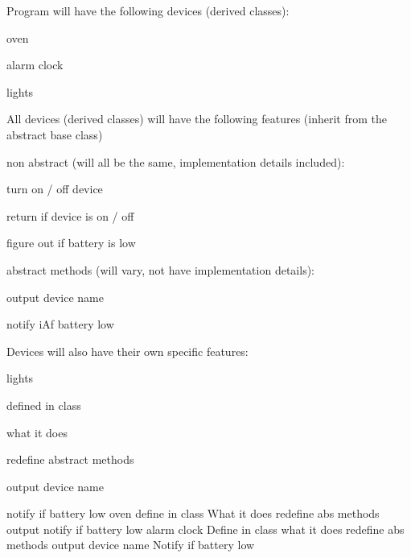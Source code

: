\begin{DoxyEnumerate}
\item Program will have the following devices (derived classes):\+
\begin{DoxyEnumerate}
\item oven
\item alarm clock
\item lights
\end{DoxyEnumerate}
\item All devices (derived classes) will have the following features (inherit from the abstract base class)
\begin{DoxyEnumerate}
\item non abstract (will all be the same, implementation details included):\+ ~\newline

\begin{DoxyEnumerate}
\item turn on /\+ off device
\item return if device is on /\+ off
\item figure out if battery is low
\end{DoxyEnumerate}
\end{DoxyEnumerate}
\begin{DoxyEnumerate}
\item abstract methods (will vary, not have implementation details):\+
\begin{DoxyEnumerate}
\item output device name
\item notify i\+Af battery low
\end{DoxyEnumerate}
\end{DoxyEnumerate}
\item Devices will also have their own specific features:\+
\begin{DoxyEnumerate}
\item lights
\begin{DoxyEnumerate}
\item defined in class
\begin{DoxyEnumerate}
\item what it does
\end{DoxyEnumerate}
\item redefine abstract methods
\begin{DoxyEnumerate}
\item output device name
\item notify if battery low oven define in class What it does redefine abs methods output notify if battery low alarm clock Define in class what it does redefine abs methods output device name Notify if battery low
\end{DoxyEnumerate}
\end{DoxyEnumerate}
\end{DoxyEnumerate}
\end{DoxyEnumerate}


